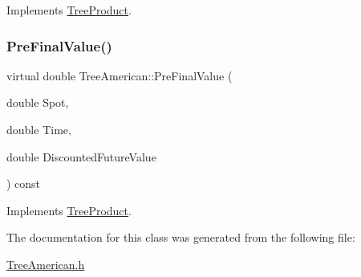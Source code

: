 Implements \hyperlink{classTreeProduct_acda7abc61cf6ac1b0f69a09eb0709832}{Tree\+Product}.

\hypertarget{classTreeAmerican_aac1d79d79a45a83a06cdbaaf9d80018e}{}\label{classTreeAmerican_aac1d79d79a45a83a06cdbaaf9d80018e} 
\subsubsection{\texorpdfstring{Pre\+Final\+Value()}{PreFinalValue()}}
{\footnotesize\ttfamily virtual double Tree\+American\+::\+Pre\+Final\+Value (\begin{DoxyParamCaption}\item[{double}]{Spot,  }\item[{double}]{Time,  }\item[{double}]{Discounted\+Future\+Value }\end{DoxyParamCaption}) const\hspace{0.3cm}{\ttfamily [virtual]}}



Implements \hyperlink{classTreeProduct_a0b58b8acdd3759f55212c1c65361056e}{Tree\+Product}.



The documentation for this class was generated from the following file\+:\begin{DoxyCompactItemize}
\item 
\hyperlink{TreeAmerican_8h}{Tree\+American.\+h}\end{DoxyCompactItemize}
